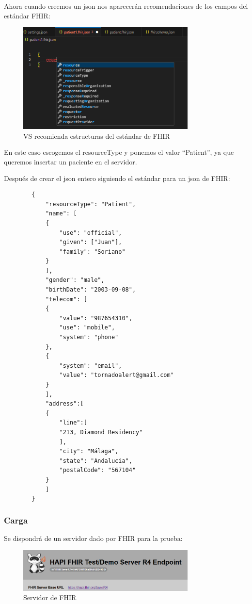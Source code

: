 \documentclass[12pt, a4paper, twoside]{article}
\begin{document}
	Ahora cuando creemos un json nos aparecerán recomendaciones de los campos del estándar FHIR:
	
	\begin{figure}[h!]
		\centering
		\includegraphics[width=0.8\textwidth]{image/4.png}
		\caption{VS recomienda estructuras del estándar de FHIR}
		\label{fig:4}
	\end{figure}
	\vspace{5cm}
	
	En este caso escogemos el resourceType y ponemos el valor “Patient”, ya que queremos insertar un paciente en el servidor.
	
	Después de crear el json entero siguiendo el estándar para un json de FHIR:
	\vspace{0.3cm}
	
	\begin{verbatim}
		{
			"resourceType": "Patient",
			"name": [
			{
				"use": "official",
				"given": ["Juan"],
				"family": "Soriano"
			}
			],
			"gender": "male",
			"birthDate": "2003-09-08",
			"telecom": [
			{
				"value": "987654310",
				"use": "mobile",
				"system": "phone"
			},
			{
				"system": "email",
				"value": "tornadoalert@gmail.com"
			}
			],
			"address":[
			{
				"line":[
				"213, Diamond Residency"
				],
				"city": "Málaga",
				"state": "Andalucia",
				"postalCode": "567104"
			}
			]
		}
	\end{verbatim}
	\cite{HL7Patient}
	\vspace{4cm}
	
	\subsubsection{Carga}
	
	Se dispondrá de un servidor dado por FHIR para la prueba:
	
	\begin{figure}[h!]
		\centering
		\includegraphics[width=0.8\textwidth]{image/5.png}
		\caption{Servidor de FHIR \cite{HAPI_FHIR}}
		\label{fig:5}
	\end{figure}
	
\end{document}
